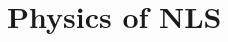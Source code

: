 \newcommand{\Rom}{R_\omega(\bar{x})}
\newcommand{\eiwz}{e^{i\omega z}}

\newcommand{\eikzwt}{e^{i(k_0z-\omega_0t)}}

\newcommand{\ec}{\mathcal{E}}
\newcommand{\ev}{\vv{\mathcal{E}}}
\newcommand{\dc}{\mathcal{D}}
\newcommand{\dv}{\vv{\mathcal{D}}}

\newcommand{\bv}{\vv{\mathcal{B}}}
\newcommand{\hv}{\vv{\mathcal{H}}}

\newcommand{\pc}{\mathcal{P}}
\newcommand{\pl}{\pc_\text{lin}}
\newcommand{\pn}{\pc_\text{nl}}
\newcommand{\pv}{\vv{\mathcal{P}}}

\newcommand{\ca}{\chi^{\text{(1)}}}
\newcommand{\cc}{\chi^{\text{(3)}}}
\newcommand{\ww}{\omega_0}
\newcommand{\kp}{k_\perp}
\newcommand{\overeq}[1]{\overset{\eqref{#1}}{=}}
\newcommand{\bigo}[1]{\mathcal{O}\left(#1\right)}

\chapter{Physics of NLS}
\label{physics}



